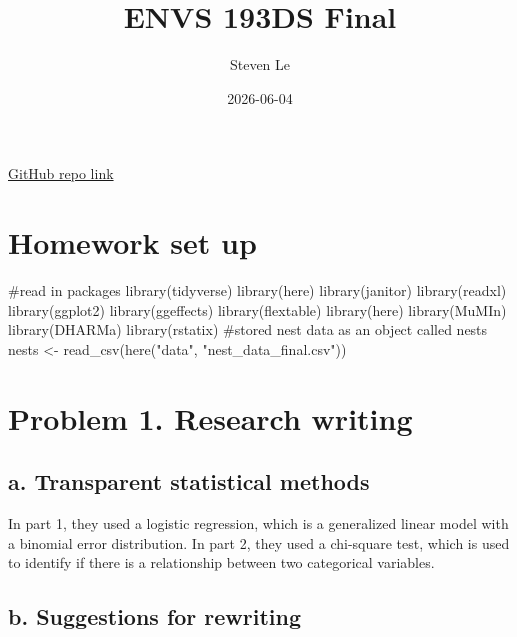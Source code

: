 \documentclass[
  letterpaper,
  DIV=11,
  numbers=noendperiod]{scrartcl}
\title{ENVS 193DS Final}
\author{Steven Le}
\date{2026-06-04}
\newenvironment{Shaded}{\begin{snugshade}}{\end{snugshade}}
\newcommand{\CommentTok}[1]{\textcolor[rgb]{0.37,0.37,0.37}{#1}}
\newcommand{\FunctionTok}[1]{\textcolor[rgb]{0.28,0.35,0.67}{#1}}
\newcommand{\NormalTok}[1]{\textcolor[rgb]{0.00,0.23,0.31}{#1}}
\newcommand{\OtherTok}[1]{\textcolor[rgb]{0.00,0.23,0.31}{#1}}
\newcommand{\StringTok}[1]{\textcolor[rgb]{0.13,0.47,0.30}{#1}}
\renewcommand*\contentsname{Table of contents}
\newcommand\contentsname{Table of contents}
\begin{document}
\maketitle

\renewcommand*\contentsname{Table of contents}
{
\setcounter{tocdepth}{3}
\tableofcontents
}

\href{https://github.com/lesteven24/ENVS-193DS_spring-2026_final.git}{GitHub
repo link}

\section{Homework set up}\label{homework-set-up}

\begin{Shaded}
\begin{Highlighting}[]
\CommentTok{\#read in packages}
\FunctionTok{library}\NormalTok{(tidyverse)}
\FunctionTok{library}\NormalTok{(here)}
\FunctionTok{library}\NormalTok{(janitor)}
\FunctionTok{library}\NormalTok{(readxl)}
\FunctionTok{library}\NormalTok{(ggplot2)}
\FunctionTok{library}\NormalTok{(ggeffects)}
\FunctionTok{library}\NormalTok{(flextable)}
\FunctionTok{library}\NormalTok{(here)}
\FunctionTok{library}\NormalTok{(MuMIn)}
\FunctionTok{library}\NormalTok{(DHARMa)}
\FunctionTok{library}\NormalTok{(rstatix)}
\CommentTok{\#stored nest data as an object called nests}
\NormalTok{nests }\OtherTok{\textless{}{-}} \FunctionTok{read\_csv}\NormalTok{(}\FunctionTok{here}\NormalTok{(}\StringTok{"data"}\NormalTok{, }\StringTok{"nest\_data\_final.csv"}\NormalTok{))}
\end{Highlighting}
\end{Shaded}

\section{Problem 1. Research writing}\label{problem-1.-research-writing}

\subsection{a. Transparent statistical
methods}\label{a.-transparent-statistical-methods}

In part 1, they used a logistic regression, which is a generalized
linear model with a binomial error distribution. In part 2, they used a
chi-square test, which is used to identify if there is a relationship
between two categorical variables.

\subsection{b. Suggestions for
rewriting}\label{b.-suggestions-for-rewriting}
\end{document}
